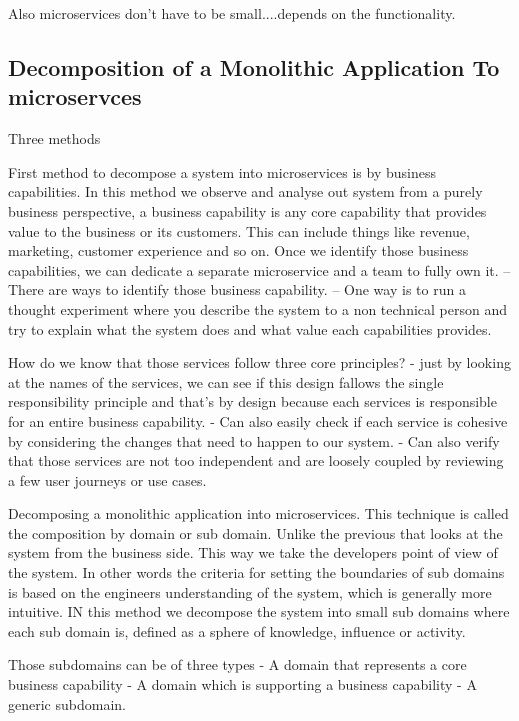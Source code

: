 \documentclass[a4paper, 11pt]{book}
\begin{document}
    Also microservices don't have to be small....depends on the functionality.

    \subsection{Decomposition of a Monolithic Application To microservces}
    Three methods

    First method to decompose a system into microservices is by business capabilities.
    In this method we observe and analyse out system from a purely business perspective, a business capability is any core capability that provides value to the business or its customers.
    This can include things like revenue, marketing, customer experience and so on.
    Once we identify those business capabilities, we can dedicate a separate microservice and a team to fully own it.
    -- There are ways to identify those business capability.
    -- One way is to run a thought experiment where you describe the system to a non technical person and try to explain what the system does and what value each capabilities provides.

    How do we know that those services follow three core principles?
    - just by looking at the names of the services, we can see if this design fallows the single responsibility principle
    and that's by design because each services is responsible for an entire business capability.
    - Can also easily check if each service is cohesive by considering the changes that need to happen to our system.
    - Can also verify that those services are not too independent and are loosely coupled by reviewing a few user journeys or use cases.

    Decomposing a monolithic application into microservices.
    This technique is called the composition by domain or sub domain.
    Unlike the previous that looks at the system from the business side.
    This way we take the developers point of view of the system.
    In other words the criteria for setting the boundaries of sub domains is based on the engineers understanding of the system, which is generally more intuitive.
    IN this method we decompose the system into small sub domains where each sub domain is, defined as a sphere of knowledge, influence or activity.

    Those subdomains can be of three types
    - A domain that represents a core business capability
    - A domain which is supporting a business capability
    - A generic subdomain.
\end{document}
